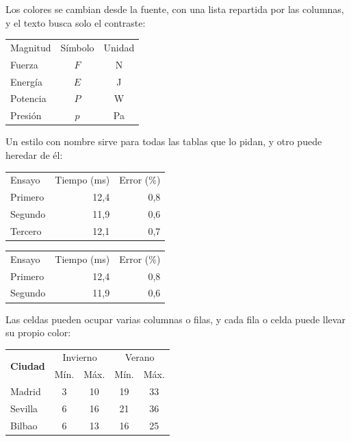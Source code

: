 Los colores se cambian desde la fuente, con una lista repartida por las columnas, y el texto busca solo el contraste:

\begin{tabular}[cabecera={orange!80!black,red!70!black,violet},filas={orange!8,white}]{lcc}
Magnitud & Símbolo & Unidad \\
Fuerza & $F$ & \si{N} \\
Energía & $E$ & \si{J} \\
Potencia & $P$ & \si{W} \\
Presión & $p$ & \si{Pa} \\
\end{tabular}

Un estilo con nombre sirve para todas las tablas que lo pidan, y otro puede heredar de él:


\begin{tabular}[estilo=sobria]{lrr}
Ensayo & Tiempo (ms) & Error (\%) \\
Primero & 12,4 & 0,8 \\
Segundo & 11,9 & 0,6 \\
Tercero & 12,1 & 0,7 \\
\end{tabular}

\begin{tabular}[estilo=sobria azul]{lrr}
Ensayo & Tiempo (ms) & Error (\%) \\
Primero & 12,4 & 0,8 \\
Segundo & 11,9 & 0,6 \\
\end{tabular}

Las celdas pueden ocupar varias columnas o filas, y cada fila o celda puede llevar su propio color:

\begin{tabular}{lcccc}
\multirow{2}{*}{\textbf{Ciudad}} & \multicolumn{2}{c}{Invierno} & \multicolumn{2}{c}{Verano} \\
 & Mín. & Máx. & Mín. & Máx. \\
Madrid & 3 & 10 & 19 & 33 \\
\rowcolor{yellow!25} Sevilla & 6 & 16 & 21 & 36 \\
Bilbao & 6 & 13 & \cellcolor{green!20}16 & \cellcolor{green!20}25 \\
\end{tabular}

